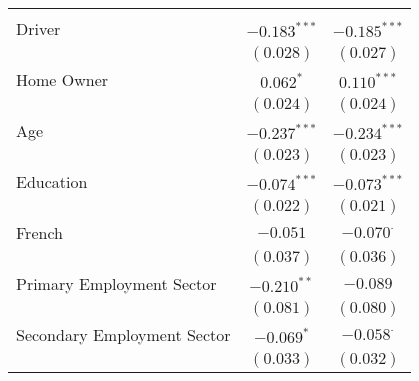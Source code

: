 \begin{center}
\begin{tiny}
\begin{longtable}{l@{} c@{} c@{}}
                                                                                                       &                  &                  \\
\quad Driver                                                                                           & $-0.183^{***}$   & $-0.185^{***}$   \\
                                                                                                       & $(0.028)$        & $(0.027)$        \\
\quad Home Owner                                                                                       & $0.062^{*}$      & $0.110^{***}$    \\
                                                                                                       & $(0.024)$        & $(0.024)$        \\
\quad Age                                                                                              & $-0.237^{***}$   & $-0.234^{***}$   \\
                                                                                                       & $(0.023)$        & $(0.023)$        \\
\quad Education                                                                                        & $-0.074^{***}$   & $-0.073^{***}$   \\
                                                                                                       & $(0.022)$        & $(0.021)$        \\
\quad French                                                                                           & $-0.051$         & $-0.070^{\cdot}$ \\
                                                                                                       & $(0.037)$        & $(0.036)$        \\
\quad Primary Employment Sector                                                                        & $-0.210^{**}$    & $-0.089$         \\
                                                                                                       & $(0.081)$        & $(0.080)$        \\
\quad Secondary Employment Sector                                                                      & $-0.069^{*}$     & $-0.058^{\cdot}$ \\
                                                                                                       & $(0.033)$        & $(0.032)$        \\

\end{longtable}
\end{tiny}
\end{center}
